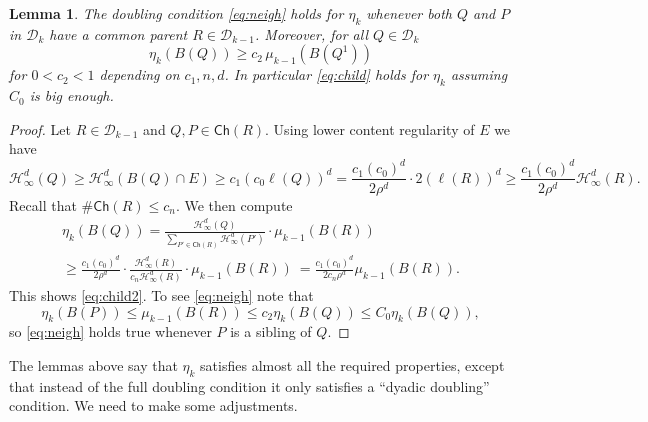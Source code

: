 \documentclass[11pt,reqno]{amsart}
\newcommand{\fr}[2]{\frac{#1}{#2}}
\newtheorem{lemma}[theorem]{Lemma}
\theoremstyle{definition}
\theoremstyle{remark}
\numberwithin{equation}{section}
\newcommand{\hdc}{\mathcal{H}^d_\infty}
\newcommand{\dD}{\mathcal{D}}
\newcommand{\DD}{\mathcal{D}}
\newcommand{\Child}{\mathsf{Ch}}
\theoremstyle{theorem}
\theoremstyle{definition}
\theoremstyle{remark}
\numberwithin{equation}{section}
\begin{document}
\begin{lemma}\label{lem:childneigheta}
	The doubling condition \eqref{eq:neigh} holds for $\eta_k$ whenever both $Q$ and $P$ in $\dD_k$ have a common parent $R \in \dD_{k-1}$. Moreover, for all $Q\in\DD_k$
	\begin{equation}\label{eq:child2}
	\eta_k(B(Q))\ge c_2\,\mu_{k-1}(B(Q^1))
	\end{equation}
	for $0<c_2<1$ depending on $c_1,n,d$. In particular \eqref{eq:child} holds for $\eta_k$ assuming $C_0$ is big enough.
\end{lemma}
%
\begin{proof}
	Let $R \in \dD_{k-1}$ and $Q,P \in \Child(R)$. Using lower content regularity of $E$ we have
	\begin{equation}\label{eq:lcrcube}
		\hdc(Q) \geq \hdc(B(Q)\cap E) \geq c_1 (c_0\ell(Q))^d = \fr{c_1 (c_0)^d}{2 \rho^d}\cdot 2 (\ell(R))^d\ge \fr{c_1 (c_0)^d}{2 \rho^d} \hdc(R).
	\end{equation}
	Recall that $\# \Child(R) \leq c_n$. We then compute
	\begin{multline*}	
		\eta_k (B(Q))  = \frac{\hdc(Q)}{\sum_{P' \in \Child(R)} \hdc(P')} \cdot \mu_{k-1}(B(R)) \nonumber \\
		 \geq \fr{c_1 (c_0)^d}{2 \rho^d} \cdot \frac{\hdc(R)}{c_n \hdc(R)} \cdot \mu_{k-1}(B(R)) \nonumber \
		= \fr{c_1 (c_0)^d}{2 c_n \rho^d} \mu_{k-1}(B(R)).
	\end{multline*}
	This shows \eqref{eq:child2}. To see \eqref{eq:neigh} note that
	\begin{equation*}
		\eta_k(B(P)) \leq \mu_{k-1}(B(R)) \le c_2 \eta_k(B(Q))\le C_0 \eta_k(B(Q)),
	\end{equation*}
	so \eqref{eq:neigh} holds true whenever $P$ is a sibling of $Q$. 
\end{proof}

%
%
%
%
%
%
%
%

%

	The lemmas above say that $\eta_k$ satisfies almost all the required properties, except that instead of the full doubling condition it only satisfies a ``dyadic doubling'' condition. We need to make some adjustments. 

\newcommand{\Poor}{\mathsf{Poor}}
\newcommand{\Rich}{\mathsf{Rich}}
\end{document}
